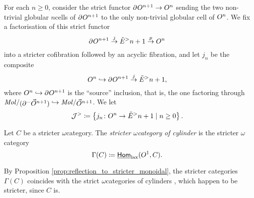 \begin{dfn} \label{dfn:generating_folk_acyclic_cof}
    For each \( n \geq 0 \), consider the strict functor \( \partial_{}^{} O^{n + 1} \to O^{n} \) sending the two non-trivial globular \( n \)\nbd cells of \( \partial_{}^{} O^{n + 1} \) to the only non-trivial globular cell of \( O^{n} \).
    We fix a factorisation of this strict functor
    \begin{equation*}
        \partial_{}^{} O^{n + 1} \stackrel{j}{\to} \tilde E^>{n + 1} \stackrel{p}{\to} O^{n}
    \end{equation*}
    into a stricter cofibration followed by an acyclic fibration, and let \( j_n \) be the composite
    \begin{equation*}
        O^{n} \hookrightarrow \partial_{}^{} O^{n + 1} \stackrel{j}{\to} \tilde E^>{n + 1},
    \end{equation*}
    where \( O^{n} \hookrightarrow \partial_{}^{} O^{n + 1} \) is the ``source'' inclusion, that is, the one factoring through \( \molecin{(\bd{}{-}\dglobe{n + 1})} \incl \molecin{\dglobe{n + 1}} \).
    We let
    \begin{equation*}
        \mathcal{J}^> \coloneqq \left\{ {j_n \colon O^{n} \to \tilde E^>{n + 1} \mid n \geq 0} \right\}.
    \end{equation*} 
\end{dfn}

\begin{dfn} 
    Let \( C \) be a stricter \( \omega \)\nbd category.
    The \emph{stricter \( \omega \)\nbd category of cylinder} is the stricter \( \omega \)\nbd category 
    \begin{equation*}
       \Gamma(C) \coloneqq \underline{\mathsf{Hom}}_{\mathrm{lax}}(O^{1}, C). 
    \end{equation*}
\end{dfn}

\begin{rmk} \label{rmk:strict_stricter_same_cylinders}
    By Proposition \ref{prop:reflection_to_stricter_monoidal}, the stricter categories \( \Gamma(C) \) coincides with the strict \( \omega \)\nbd categories of cylinders \cite[Remark 20.2.9]{ara2025polygraphs}, which happen to be stricter, since \( C \) is.
\end{rmk}

